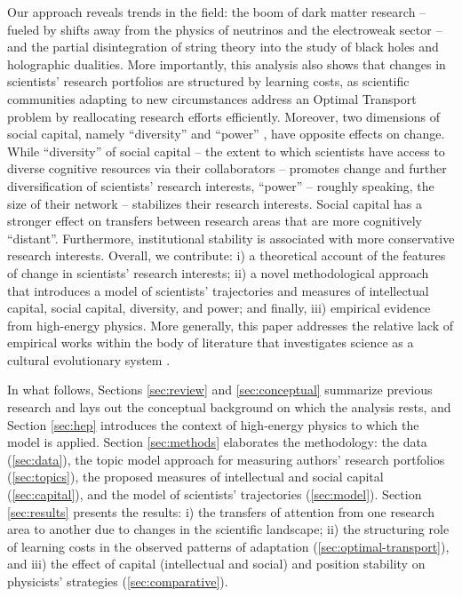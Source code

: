 \documentclass{article}
\begin{document}
Our approach reveals trends in the field: the boom of dark matter research -- fueled by shifts away from the physics of neutrinos and the electroweak sector -- and the partial disintegration of string theory into the study of black holes and holographic dualities. More importantly, this analysis also shows that changes in scientists' research portfolios are structured by learning costs, as scientific communities adapting to new circumstances address an Optimal Transport problem by reallocating research efforts efficiently. Moreover, two dimensions of social capital, namely ``diversity'' and ``power'' \citep{Abbasi2014}, have opposite effects on change. While ``diversity'' of social capital  -- the extent to which scientists have access to diverse cognitive resources via their collaborators -- promotes change and further diversification of scientists' research interests, ``power'' -- roughly speaking, the size of their network -- stabilizes their research interests. Social capital has a stronger effect on transfers between research areas that are more cognitively ``distant''. Furthermore, institutional stability is associated with more conservative research interests. %
Overall, we contribute: i) a theoretical account of the features of change in scientists' research interests; ii) a novel methodological approach that introduces a model of scientists' trajectories and measures of intellectual capital, social capital, diversity, and power; and finally, iii) empirical evidence from high-energy physics. More generally, this paper addresses the relative lack of empirical works within the body of literature that investigates science as a cultural evolutionary system \citep{Wu2023}.

In what follows, Sections \ref{sec:review} and \ref{sec:conceptual} summarize previous research and lays out the conceptual background on which the analysis rests, and Section \ref{sec:hep} introduces the context of high-energy physics to which the model is applied. %
Section \ref{sec:methods} elaborates the methodology: the data (\ref{sec:data}), the topic model approach for measuring authors' research portfolios (\ref{sec:topics}), the proposed measures of intellectual and social capital (\ref{sec:capital}), and the model of scientists' trajectories (\ref{sec:model}).
Section \ref{sec:results} presents the results: i) the transfers of attention from one research area to another due to changes in the scientific landscape; ii) the structuring role of learning costs in the observed patterns of adaptation (\ref{sec:optimal-transport}), and iii) the effect of capital (intellectual and social) and position stability on physicists' strategies (\ref{sec:comparative}). %
\end{document}
